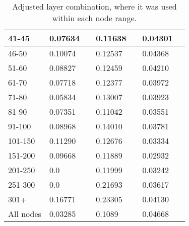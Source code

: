 \begin{table*}[h!]
\begin{tabular}{|l|l|l||l|l||l|l|}
        41-45     & 0.07634                                 &                                & 0.11638                          &                  & 0.04301       &                  \\ \hline
        46-50     & 0.10074                                 &                                & 0.12537                          &                  & 0.04368       &                  \\ \hline
        51-60     & 0.08827                                 &                                & 0.12459                          &                  & 0.04210       &                  \\ \hline
        61-70     & 0.07718                                 &                                & 0.12377                          &                  & 0.03972       &                  \\ \hline
        71-80     & 0.05834                                 &                                & 0.13007                          &                  & 0.03923       &                  \\ \hline
        81-90     & 0.07351                                 &                                & 0.11042                          &                  & 0.03551       &                  \\ \hline
        91-100    & 0.08968                                 &                                & 0.14010                          &                  & 0.03781       &                  \\ \hline
        101-150   & 0.11290                                 &                                & 0.12676                          &                  & 0.03334       &                  \\ \hline
        151-200   & 0.09668                                 &                                & 0.11889                          &                  & 0.02932       &                  \\ \hline
        201-250   & 0.0                                     &                                & 0.11999                          &                  & 0.03242       &                  \\ \hline
        251-300   & 0.0                                     &                                & 0.21693                          &                  & 0.03617       &                  \\ \hline
        301+      & 0.16771                                 &                                & 0.23305                          &                  & 0.04130       &                  \\ \hline
        All nodes & 0.03285                                 &                                & 0.1089                           &                  & 0.04668       &                  \\ \hline
    \end{tabular}
    \caption{Adjusted layer combination, where it was used within each node range.}
    \label{tab:ndcg-adjusted-layer-bad-performance}
\end{table*}

